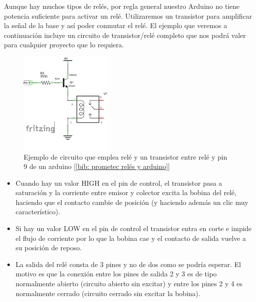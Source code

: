 \documentclass[12pt]{article}
\begin{document}
	\noindent Aunque hay muchos tipos de relés, por regla general nuestro Arduino no tiene potencia suficiente para activar un relé. Utilizaremos un transistor para amplificar la señal de la base y así poder conmutar el relé. El ejemplo que veremos a continuación incluye un circuito de transistor/relé completo que nos podrá valer para  cualquier proyecto que lo requiera.
	
	\begin{figure}[h]
		\begin{center}
			\includegraphics[width=0.4\textwidth]{img/rele_transistor.jpg}
			\caption{Ejemplo de circuito que emplea relé y un transistor entre relé y pin 9 de un arduino [\ref{bib: prometec relés y arduino}]}
			\label{Ejemplo rele con transistor}
		\end{center}
	\end{figure}
	
	\begin{itemize}
		\item Cuando hay un valor HIGH en el pin de control,  el transistor pasa a saturación  y la corriente entre emisor y colector excita la bobina del relé, haciendo que el contacto cambie de posición (y haciendo además un clic muy característico).
		
		\item Si hay un valor LOW en el pin de control el transistor entra en corte e impide el flujo de corriente por lo que la bobina cae y el contacto de salida vuelve a su posición de reposo.
		
		\item La salida del relé consta de 3 pines y no de dos como se podría esperar.  El motivo es que la conexión entre los pines de salida 2 y 3 es de tipo normalmente abierto (circuito abierto sin excitar) y entre los pines 2 y 4 es normalmente cerrado (circuito cerrado sin excitar la bobina).

	\end{itemize}
	
\end{document}
